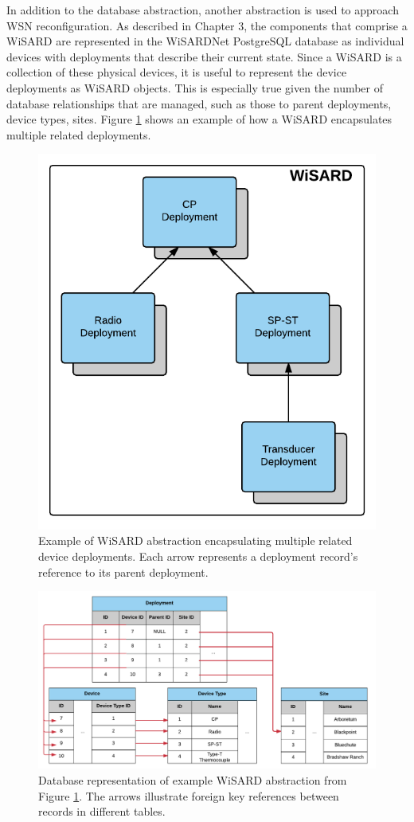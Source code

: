 In addition to the database abstraction, another abstraction is used to approach WSN reconfiguration. As described in Chapter 3, the components that comprise a WiSARD are represented in the WiSARDNet PostgreSQL database as individual devices with deployments that describe their current state. Since a WiSARD is a collection of these physical devices, it is useful to represent the device deployments as WiSARD objects. This is especially true given the number of database relationships that are managed, such as those to parent deployments, device types, sites. Figure \ref{fig:wisard_object} shows an example of how a WiSARD encapsulates multiple related deployments. 

\begin{figure}[H]
	\centering
	\includegraphics[width=.6\textwidth]{figures/wisard_abstraction_example.png}
	\caption{Example of WiSARD abstraction encapsulating multiple related device deployments. Each arrow represents a deployment record's reference to its parent deployment.}
	\label{fig:wisard_object}
\end{figure}

\begin{figure}[H]
	\centering
	\includegraphics[width=\textwidth]{figures/wisard_abstraction_example_database.png}
	\caption{Database representation of example WiSARD abstraction from Figure \ref{fig:wisard_object}. The arrows illustrate foreign key references between records in different tables.}
	\label{fig:wisard_object_database}
\end{figure}

